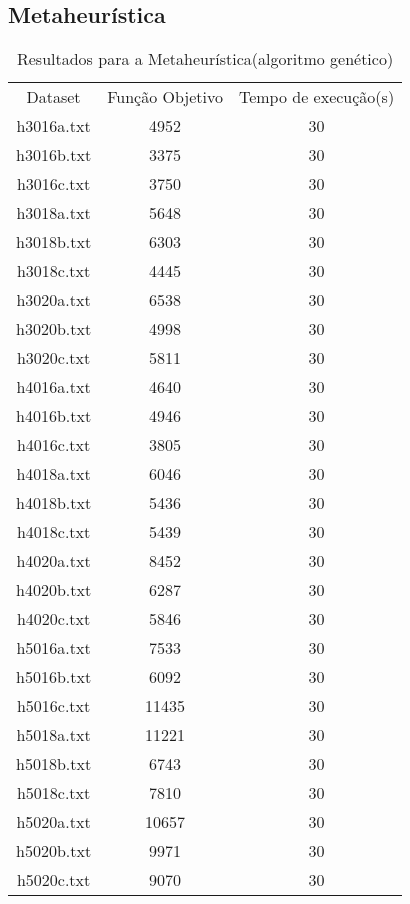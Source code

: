 \documentclass[a4paper,11pt]{article}
\begin{document}
\subsection{Metaheurística}
\begin{table}[h]
  \centering
  \begin{tabular}{c c c}
    Dataset & Função Objetivo & Tempo de execução(s) \\
    h3016a.txt & 4952  & 30 \\
    h3016b.txt & 3375  & 30 \\
    h3016c.txt & 3750  & 30 \\
    h3018a.txt & 5648  & 30 \\
    h3018b.txt & 6303  & 30 \\
    h3018c.txt & 4445  & 30 \\
    h3020a.txt & 6538  & 30 \\
    h3020b.txt & 4998  & 30 \\
    h3020c.txt & 5811  & 30 \\
    h4016a.txt & 4640  & 30 \\
    h4016b.txt & 4946  & 30 \\
    h4016c.txt & 3805  & 30 \\
    h4018a.txt & 6046  & 30 \\
    h4018b.txt & 5436  & 30 \\
    h4018c.txt & 5439  & 30 \\
    h4020a.txt & 8452  & 30 \\
    h4020b.txt & 6287  & 30 \\
    h4020c.txt & 5846  & 30 \\
    h5016a.txt & 7533  & 30 \\
    h5016b.txt & 6092  & 30 \\
    h5016c.txt & 11435 & 30 \\
    h5018a.txt & 11221 & 30 \\
    h5018b.txt & 6743  & 30 \\
    h5018c.txt & 7810  & 30 \\
    h5020a.txt & 10657 & 30 \\
    h5020b.txt & 9971  & 30 \\
    h5020c.txt & 9070  & 30 \\
  \end{tabular}
  \caption{Resultados para a Metaheurística(algoritmo genético)}
  \label{meta}
\end{table}
\end{document}

